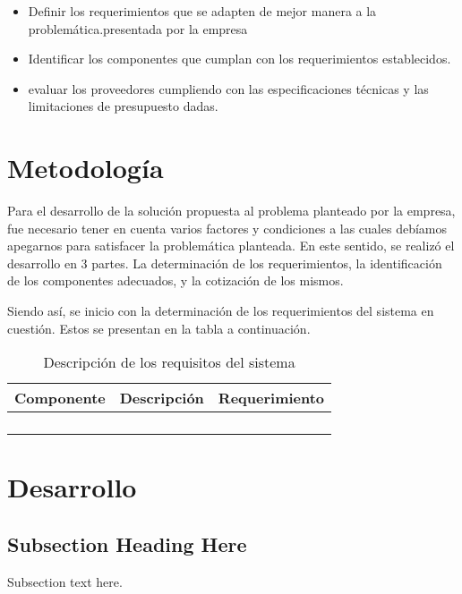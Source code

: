 \documentclass[conference,onecolumn]{IEEEtran}
\begin{document}
\begin{itemize}
    \item Definir los requerimientos que se adapten de mejor manera a la problemática.presentada por la empresa \medbreak
    \item Identificar los componentes que cumplan con los requerimientos establecidos.\medbreak
    \item evaluar los proveedores cumpliendo con las especificaciones técnicas y las limitaciones de presupuesto dadas. \medbreak
\end{itemize}

\section{Metodología}

Para el desarrollo de la solución propuesta al problema planteado por la empresa, fue necesario tener en cuenta varios factores y condiciones a las cuales debíamos apegarnos para satisfacer la problemática planteada. En este sentido, se realizó el desarrollo en 3 partes. La determinación de los requerimientos, la identificación de los componentes adecuados, y la cotización de los mismos.

Siendo así, se inicio con la determinación de los requerimientos del sistema en cuestión. Estos se presentan en la tabla a continuación.

\begin{table}[H]
    \centering
    \begin{tabular}{|p{3cm}|p{3cm}|p{3cm}|}
        \hline
        Componente & Descripción & Requerimiento \\ \hline
                          &  &  \\ \hline
                          &  &  \\ \hline
                          &  &  \\ \hline
                          &  &  \\ \hline
        \end{tabular}
    \medbreak
    \caption{\label{tab:ReqTable}Descripción de los requisitos del sistema}
\end{table}


\section{Desarrollo}

\subsection{Subsection Heading Here}
Subsection text here.
\end{document}
